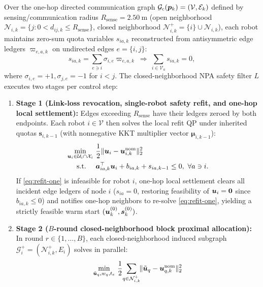 Over the one-hop directed communication graph $\mathcal G_{\mathrm c}(\boldsymbol{p}_k)=(\mathcal V,\mathcal E_k)$ defined by sensing/communication radius $R_{\mathrm{sense}}=2.50\ \mathrm m$ (open neighborhood $\mathcal N_{i,k}=\{j:0<d_{ij,k}\le R_{\mathrm{sense}}\}$, closed neighborhood $\mathcal N_{i,k}^+=\{i\}\cup\mathcal N_{i,k}$), each robot maintains zero-sum quota variables $s_{ia,k}$ reconstructed from antisymmetric edge ledgers $\varpi_{e,a,k}$ on undirected edges $e=\{i,j\}$:
\begin{equation}
 s_{ia,k}=\sum_{e\ni i}\sigma_{i,e}\varpi_{e,a,k}\ \Longrightarrow\ \sum_{i\in\mathcal V_a}s_{ia,k}=0,
 \label{eq:edge-ledger}
\end{equation}
where $\sigma_{i,e}=+1,\sigma_{j,e}=-1$ for $i<j$. The closed-neighborhood NPA safety filter $L$ executes two stages per control step:
\begin{enumerate}
 \item \textbf{Stage 1 (Link-loss revocation, single-robot safety refit, and one-hop local settlement):} Edges exceeding $R_{\mathrm{sense}}$ have their ledgers zeroed by both endpoints. Each robot $i\in\mathcal V$ then solves the local refit QP under inherited quotas $\boldsymbol s_{i,k-1}$ (with nonnegative KKT multiplier vector $\boldsymbol\mu_{i,k-1}$):
 \begin{equation}
 \begin{split}
  \min_{\bu_i\in\mathcal U_i\cap\mathcal X_i}&\ \frac12\norm{\bu_i-\bu_{i,k}^{\mathrm{nom}}}_2^2\\
  \text{s.t.}\quad&\ \boldsymbol a_{ia,k}^{\top}\bu_i+b_{ia,k}+s_{ia,k-1}\le 0,\ \forall a\ni i.
 \end{split}\label{eq:refit-one}
 \end{equation}
 If \eqref{eq:refit-one} is infeasible for robot $i$, one-hop local settlement clears all incident edge ledgers of node $i$ ($s_{ia}=0$, restoring feasibility of $\boldsymbol{u}_i=\boldsymbol 0$ since $b_{ia,k}\le 0$) and notifies one-hop neighbors to re-solve \eqref{eq:refit-one}, yielding a strictly feasible warm start $(\boldsymbol{u}_k^{(0)},\boldsymbol s_k^{(0)})$.
 \item \textbf{Stage 2 ($B$-round closed-neighborhood block proximal allocation):} In round $r\in\{1,\dots,B\}$, each closed-neighborhood induced subgraph $\mathcal G_i^+=(\mathcal N_{i,k}^+,E_i)$ solves in parallel:
 \begin{equation}
 \begin{split}
  \min_{\tilde\bu_q,w_q,t_e}&\ \frac12\!\sum_{q\in\mathcal N_{i,k}^+}\!\norm{\tilde\bu_q-\bu_{q,k}^{\mathrm{nom}}}_2^2\\

\end{split}
\end{equation}
\end{enumerate}
